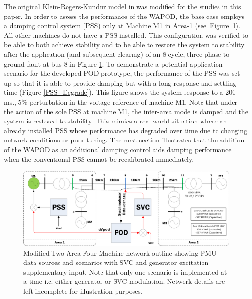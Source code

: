 \documentclass[journal]{IEEEtran}
\begin{document}
The original Klein-Rogers-Kundur model in \cite{KundurTwoArea} was modified for the studies in this paper. In order to assess the performance of the WAPOD, the base case employs a damping control system (PSS) only at Machine M1 in Area-1 (see~Figure~\ref{NetworkOutline}). All other machines do not have a PSS installed. This configuration was  verified to be able to both achieve stability and to be able to restore the system to stability after the application (and subsequent clearing) of an 8 cycle, three-phase to ground fault at bus 8 in Figure \ref{NetworkOutline}. To demonstrate a potential application scenario for the developed POD prototype, the performance of the PSS was set up so that it is able to provide damping but with a long response and settling time (Figure \ref{PSS_Degrade}). This figure shows the system response to a 200 ms., 5\% perturbation in the voltage reference of machine M1. Note that under the action of the sole PSS at machine M1, the inter-area mode is damped and the system is restored to stability. This mimics a real-world situation where an already installed PSS whose performance has degraded over time due to changing network conditions or poor tuning. The next section illustrates that the addition of the WAPOD as an additional damping control aids damping performance when the conventional PSS cannot be recalibrated immediately.

\begin{figure}[!th]
\centering
\includegraphics[width=5in]{Kundur2Area_outline_multi.png}
\caption{Modified Two-Area Four-Machine network outline showing PMU data sources and scenarios with SVC and generator excitation supplementary input. Note that only one scenario is implemented at a time i.e. either generator or SVC modulation. Network details are left incomplete for illustration purposes.}
\label{NetworkOutline}
\end{figure}

\end{document}
